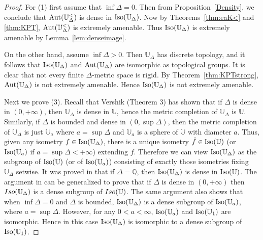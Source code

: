 \documentclass{amsart}
\theoremstyle{definition}
\theoremstyle{remark}
\begin{document}
\begin{proof} For (1) first assume that $\inf\Delta=0$. Then from Proposition~\ref{Density}, we conclude that $\mbox{\rm Aut}(\mathbb{U}_\Delta^<)$ is dense in $\mbox{\rm Iso}(\mathbb{U}_\Delta)$. Now by Theorems~\ref{thm:eaK<} and \ref{thm:KPT}, $\mbox{\rm Aut}(\mathbb{U}^<_\Delta)$ is extremely amenable. Thus $\mbox{\rm Iso}(\mathbb{U}_\Delta)$ is extremely amenable by Lemma~\ref{lem:denseimage}.

On the other hand, assume $\inf\Delta>0$. Then $\mathbb{U}_\Delta$ has discrete topology, and it follows that $\mbox{\rm Iso}(\mathbb{U}_\Delta)$ and $\mbox{\rm Aut}(\mathbb{U}_\Delta)$ are isomorphic as topological groups. It is clear that not every finite $\Delta$-metric space is rigid. By Theorem~\ref{thm:KPTstrong}, $\mbox{\rm Aut}(\mathbb{U}_\Delta)$ is not extremely amenable. Hence $\mbox{\rm Iso}(\mathbb{U}_\Delta)$ is not extremely amenable.

Next we prove (3). Recall that Vershik \cite{Vershik} (Theorem 3) has shown that if $\Delta$ is dense in $(0,+\infty)$, then $\mathbb{U}_\Delta$ is dense in $\mathbb{U}$, hence the metric completion of $\mathbb{U}_\Delta$ is $\mathbb{U}$. Similarly, if $\Delta$ is bounded and dense in $(0,\sup\Delta)$, then the metric completion of $\mathbb{U}_\Delta$ is just $\mathbb{U}_a$ where $a=\sup\Delta$ and $\mathbb{U}_a$ is a sphere of $\mathbb{U}$ with diameter $a$. Thus, given any isometry $f\in \mbox{\rm Iso}(\mathbb{U}_\Delta)$, there is a unique isometry $\hat{f}\in \mbox{\rm Iso}(\mathbb{U})$ (or $\mbox{\rm Iso}(\mathbb{U}_a)$ if $a=\sup\Delta<+\infty$) extending $f$. Therefore we can view $\mbox{\rm Iso}(\mathbb{U}_\Delta)$ as the subgroup of $\mbox{\rm Iso}(\mathbb{U})$ (or of $\mbox{\rm Iso}(\mathbb{U}_a)$) consisting of exactly those isometries  fixing $\mathbb{U}_\Delta$ setwise. 
It was proved in \cite{CV} that if $\Delta=\mathbb{Q}$, then $\mbox{\rm Iso}(\mathbb{U}_\Delta)$ is dense in $\mbox{\rm Iso}(\mathbb{U})$. The argument in \cite{CV} can be generalized to prove that if $\Delta$ is dense in $(0,+\infty)$ then ${\rm Iso}(\mathbb{U}_\Delta)$ is a dense subgroup of ${\rm Iso}(\mathbb{U})$. The same argument also shows that when $\inf\Delta=0$ and $\Delta$ is bounded, $\mbox{\rm Iso}(\mathbb{U}_\Delta)$ is a dense subgroup of $\mbox{\rm Iso}(\mathbb{U}_a)$, where $a=\sup\Delta$. However, for any $0<a<\infty$, $\mbox{\rm Iso}(\mathbb{U}_a)$ and $\mbox{\rm Iso}(\mathbb{U}_1)$ are isomorphic. Hence in this case $\mbox{\rm Iso}(\mathbb{U}_\Delta)$ is isomorphic to a dense subgroup of $\mbox{\rm Iso}(\mathbb{U}_1)$.
          

\end{proof}
\end{document}
